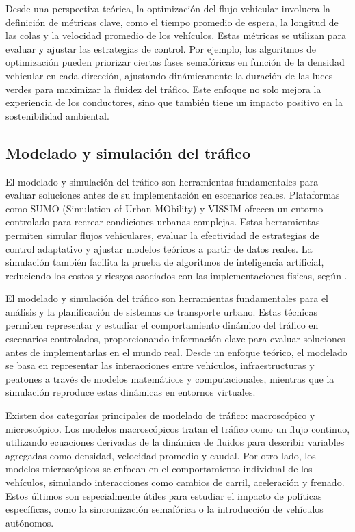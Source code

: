 Desde una perspectiva teórica, la optimización del flujo vehicular involucra la definición de métricas clave, como el tiempo promedio de espera, la longitud de las colas y la velocidad promedio de los vehículos. Estas métricas se utilizan para evaluar y ajustar las estrategias de control. Por ejemplo, los algoritmos de optimización pueden priorizar ciertas fases semafóricas en función de la densidad vehicular en cada dirección, ajustando dinámicamente la duración de las luces verdes para maximizar la fluidez del tráfico. Este enfoque no solo mejora la experiencia de los conductores, sino que también tiene un impacto positivo en la sostenibilidad ambiental.

\subsection{Modelado y simulación del tráfico}
El modelado y simulación del tráfico son herramientas fundamentales para evaluar soluciones antes de su implementación en escenarios reales. Plataformas como SUMO (Simulation of Urban MObility) y VISSIM ofrecen un entorno controlado para recrear condiciones urbanas complejas. Estas herramientas permiten simular flujos vehiculares, evaluar la efectividad de estrategias de control adaptativo y ajustar modelos teóricos a partir de datos reales. La simulación también facilita la prueba de algoritmos de inteligencia artificial, reduciendo los costos y riesgos asociados con las implementaciones físicas, según \cite{TrafficSimulation2020}.

El modelado y simulación del tráfico son herramientas fundamentales para el análisis y la planificación de sistemas de transporte urbano. Estas técnicas permiten representar y estudiar el comportamiento dinámico del tráfico en escenarios controlados, proporcionando información clave para evaluar soluciones antes de implementarlas en el mundo real. Desde un enfoque teórico, el modelado se basa en representar las interacciones entre vehículos, infraestructuras y peatones a través de modelos matemáticos y computacionales, mientras que la simulación reproduce estas dinámicas en entornos virtuales.

Existen dos categorías principales de modelado de tráfico: macroscópico y microscópico. Los modelos macroscópicos tratan el tráfico como un flujo continuo, utilizando ecuaciones derivadas de la dinámica de fluidos para describir variables agregadas como densidad, velocidad promedio y caudal. Por otro lado, los modelos microscópicos se enfocan en el comportamiento individual de los vehículos, simulando interacciones como cambios de carril, aceleración y frenado. Estos últimos son especialmente útiles para estudiar el impacto de políticas específicas, como la sincronización semafórica o la introducción de vehículos autónomos.

